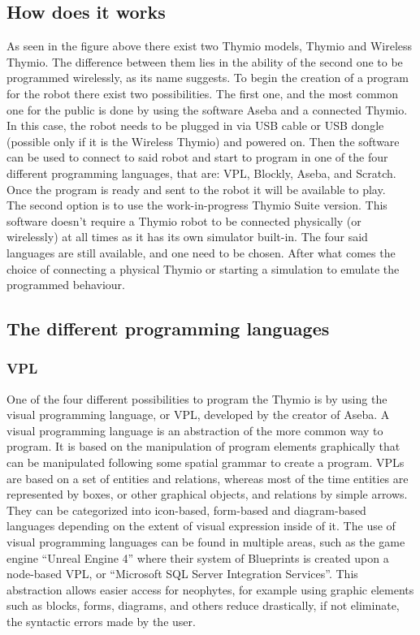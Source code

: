\documentclass{scrartcl}
\begin{document}
\subsection{How does it works} \label{howdoesitworkref}

As seen in the figure above there exist two Thymio models, Thymio and Wireless Thymio. 
The difference between them lies in the ability of the second one to be programmed wirelessly, 
as its name suggests. To begin the creation of a program for the robot there exist two possibilities.
The first one, and the most common one for the public is done by using the software Aseba and a connected Thymio. 
In this case, the robot needs to be plugged in via USB cable or USB dongle (possible only if it is the Wireless Thymio) and powered on. 
Then the software can be used to connect to said robot and start to program in one of the four different programming languages, 
that are: VPL, Blockly, Aseba, and Scratch. Once the program is ready and sent to the robot it will be available to play. \\

The second option is to use the work-in-progress Thymio Suite version. 
This software doesn’t require a Thymio robot to be connected physically (or wirelessly) at all times as it has its own simulator built-in. 
The four said languages are still available, and one need to be chosen. 
After what comes the choice of connecting a physical Thymio or starting a simulation to emulate the programmed behaviour.

\subsection{The different programming languages}
\subsubsection{VPL}

One of the four different possibilities to program the Thymio is by using the visual programming language, or VPL, 
developed by the creator of Aseba. A visual programming language is an abstraction of the more common way to program. 
It is based on the manipulation of program elements graphically that can be manipulated following some spatial grammar to create a program. 
VPLs are based on a set of entities and relations, whereas most of the time entities are represented by boxes, 
or other graphical objects, and relations by simple arrows. They can be categorized into icon-based, 
form-based and diagram-based languages depending on the extent of visual expression inside of it. 
The use of visual programming languages can be found in multiple areas, such as the game engine “Unreal Engine 4” where their system of Blueprints is created upon a node-based VPL, 
or “Microsoft SQL Server Integration Services”. This abstraction allows easier access for neophytes, 
for example using graphic elements such as blocks, forms, diagrams, and others reduce drastically, if not eliminate, the syntactic errors made by the user.\\
\end{document}
